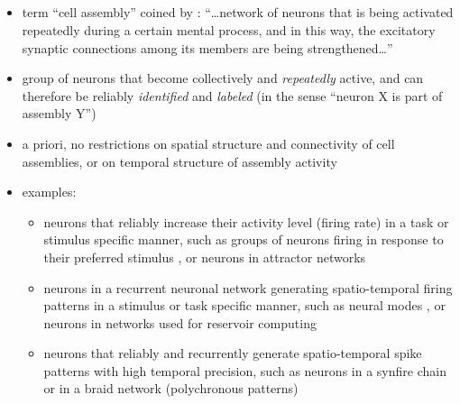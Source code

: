 \documentclass[8pt,t,usepdftitle=false]{beamer}
\begin{document}
\subsection{\sttl}
\begin{frame}[plain]
  \frametitle{\sttl}
  \begin{itemize}
  \item<1-> term ``cell assembly'' coined by \textcite{Hebb49}: ``\ldots network of neurons that is being activated repeatedly during a certain mental process, and in this way, the excitatory synaptic connections among its members are being strengthened\ldots''
    {\tiny\color{gray} \parencite{Abeles11_1505}}
  \end{itemize}
  \vspace*{2ex}
  \begin{itemize}
  \item<2->  group of neurons that become collectively and \emph{repeatedly} active, and can therefore be reliably \emph{identified} and \emph{labeled} (in the sense ``neuron X is part of assembly Y'')
  \item<2-> a priori, no restrictions on spatial structure and connectivity of cell assemblies, or on temporal structure of assembly activity
  \item<3-> examples:
    \begin{itemize}\itemsep1ex
    \item<3-> neurons that reliably increase their activity level (firing rate) in a task or stimulus specific manner, such as groups of neurons firing in response to their preferred stimulus
      {\tiny\color{gray}\parencite{Hubel59}}
      , or neurons in attractor networks
      {\tiny\color{gray}\parencite{Hopfield82}}
    \item<4-> neurons in a recurrent neuronal network generating spatio-temporal firing patterns in a stimulus or task specific manner, such as neural modes
      {\tiny\color{gray}\parencite{Gallego17_978}}
      , or neurons in networks used for reservoir computing
      {\tiny\color{gray}\parencite{Jaeger01_echo,Maass02_2531,Jaeger04_87}}
    \item<5-> neurons that reliably and recurrently generate spatio-temporal spike patterns with
      high temporal precision, such as neurons in a synfire chain
      {\tiny\color{gray}\parencite{Abeles91}}      
      or in a braid network (polychronous patterns)
      {\tiny\color{gray}\parencite{Bienenstock95,Izhikevich06_245}}      
    \end{itemize}
  \end{itemize}
\end{frame}
\def\sttl{Spatiotemporal spike patterns in monkey motor cortex}
\end{document}
